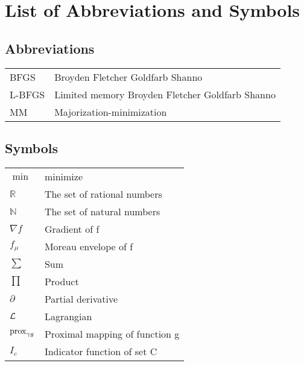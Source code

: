\chapter{List of Abbreviations and Symbols}
\section*{Abbreviations}
\begin{flushleft}
  \renewcommand{\arraystretch}{1.1}
  \begin{tabularx}{\textwidth}{@{}p{18mm}X@{}}
  	BFGS   		& Broyden Fletcher Goldfarb Shanno \\
   	L-BFGS   	& Limited memory Broyden Fletcher Goldfarb Shanno \\
   	MM     		& Majorization-minimization
  \end{tabularx}
\end{flushleft}
\section*{Symbols}
\begin{flushleft}
  \renewcommand{\arraystretch}{1.1}
  \begin{tabularx}{\textwidth}{@{}p{12mm}X@{}}
    $\min$    & minimize \\
    $\mathbb{R}$   & The set of rational numbers \\
    $\mathbb{N}$   & The set of natural numbers \\
    $\nabla f$     & Gradient of f \\
    $f_{\mu}$      & Moreau envelope of f \\
    $\sum$         & Sum \\
    $\prod$        & Product \\
    $\partial$     & Partial derivative \\
    $\mathcal{L} $       & Lagrangian \\
    $\operatorname{prox}_{\gamma g}$ & Proximal mapping of function g \\
    $I_c$          & Indicator function of set C \\
  \end{tabularx}
\end{flushleft}